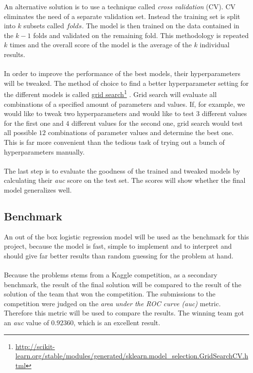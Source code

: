 \documentclass[11pt]{article}
\newcommand\fnurl[2]{%
\href{#2}{#1}\footnote{\url{#2}}%
}
\begin{document}
An alternative solution is to use a technique called {\it cross validation} (CV).
CV eliminates the need of a separate validation set. Instead
the training set is split into $k$ subsets called $folds$. The model is then
trained on the data contained in the $k-1$ folds and validated on the remaining fold.
This methodology is repeated $k$ times and the overall score of the model is the
average of the $k$ individual results.
\\ \\
In order to improve the performance of the best models, their hyperparameters
will be tweaked. The method of choice to find a better hyperparameter setting
for the different models is called
\fnurl{grid search}{http://scikit-learn.org/stable/modules/generated/sklearn.model_selection.GridSearchCV.html}.
Grid search will evaluate all combinations of a specified amount of parameters and values.
If, for example, we would like to tweak two hyperparameters and would like to test
$3$ different values for the first one and $4$ different values for the second one,
grid search would test all possible $12$ combinations of parameter values
and determine the best one.
This is far more convenient than the tedious task of trying out a bunch of hyperparameters manually.
\\ \\
The last step is to evaluate the goodness of the trained and tweaked models
by calculating their {\it auc} score on the test set.
The scores will show whether the final model generalizes well.

\subsection{Benchmark}

An out of the box logistic regression model will be used as the benchmark for 
this project, because the model is fast, simple to implement and to interpret 
and should give far better results than random guessing for the problem at hand.
\\ \\
Because the problems stems from a Kaggle competition, as a secondary benchmark, 
the result of the final solution will be compared to the result of the solution 
of the team that won the competition. 
The submissions to the competition were judged on the 
{\it area under the ROC curve (auc)} metric. 
Therefore this metric will be used to compare the results. 
The winning team got an {\it auc} value 
of $0.92360$, which is an excellent result.
\end{document}
